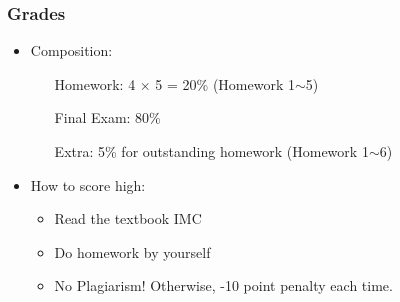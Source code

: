 \begin{frame}\frametitle{Grades}
\begin{itemize}
\item Composition:
\begin{itemize}
\item[Homework:] 4 $\times$ 5 = 20\% (Homework 1$\sim$5)
\item[Final Exam:] 80\%
\item[Extra:]  5\% for outstanding homework (Homework 1$\sim$6)
\end{itemize}
\item How to score high:
\begin{itemize}
\item Read the textbook IMC
\item Do homework by yourself
\item \alert{No Plagiarism! Otherwise, -10 point penalty each time.} 
\end{itemize}
\end{itemize}
\end{frame}

